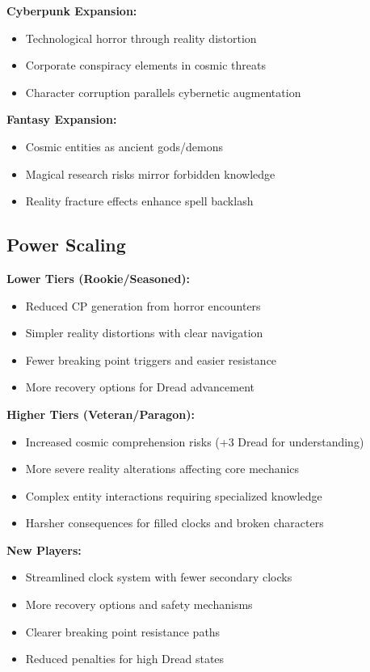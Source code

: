 \documentclass[11pt]{article}
\begin{document}
\textbf{Cyberpunk Expansion:}
\begin{itemize}
\item Technological horror through reality distortion
\item Corporate conspiracy elements in cosmic threats
\item Character corruption parallels cybernetic augmentation
\end{itemize}

\textbf{Fantasy Expansion:}
\begin{itemize}
\item Cosmic entities as ancient gods/demons
\item Magical research risks mirror forbidden knowledge
\item Reality fracture effects enhance spell backlash
\end{itemize}

\subsection{Power Scaling}

\textbf{Lower Tiers (Rookie/Seasoned):}
\begin{itemize}
\item Reduced CP generation from horror encounters
\item Simpler reality distortions with clear navigation
\item Fewer breaking point triggers and easier resistance
\item More recovery options for Dread advancement
\end{itemize}

\textbf{Higher Tiers (Veteran/Paragon):}
\begin{itemize}
\item Increased cosmic comprehension risks (+3 Dread for understanding)
\item More severe reality alterations affecting core mechanics
\item Complex entity interactions requiring specialized knowledge
\item Harsher consequences for filled clocks and broken characters
\end{itemize}

\textbf{New Players:}
\begin{itemize}
\item Streamlined clock system with fewer secondary clocks
\item More recovery options and safety mechanisms
\item Clearer breaking point resistance paths
\item Reduced penalties for high Dread states
\end{itemize}
\end{document}
